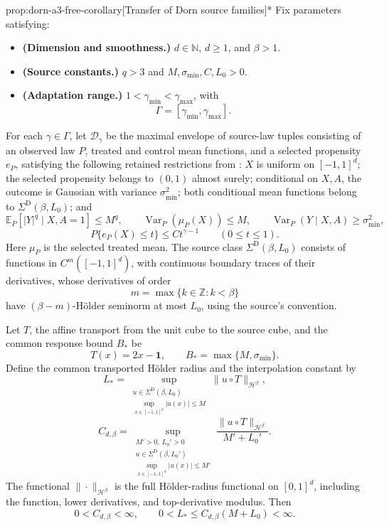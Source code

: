 \documentclass[11pt]{article}
\begin{document}
\begin{propositionv}{prop:dorn-a3-free-corollary}[Transfer of Dorn source families]*
Fix parameters satisfying:
\begin{itemize}
\item \textbf{(Dimension and smoothness.)} \(d\in\mathbb N\), \(d\ge1\), and \(\beta>1\).
\item \textbf{(Source constants.)} \(q>3\) and \(M,\sigma_{\min},C,L_0>0\).
\item \textbf{(Adaptation range.)} \(1<\gamma_{\min}<\gamma_{\max}\), with
\[
\Gamma=[\gamma_{\min},\gamma_{\max}].
\]
\end{itemize}

For each \(\gamma\in\Gamma\), let \(\mathcal D_\gamma\) be the maximal envelope of source-law tuples consisting of an observed law \(P\), treated and control mean functions, and a selected propensity \(e_P\), satisfying the following retained restrictions from \citet[Section 2, Assumptions 1--2, pp.~3--7]{Dorn2026GlobalOverlap}: \(X\) is uniform on \([-1,1]^d\); the selected propensity belongs to \((0,1)\) almost surely; conditional on \(X,A\), the outcome is Gaussian with variance \(\sigma_{\min}^2\); both conditional mean functions belong to \(\Sigma^{\mathrm D}(\beta,L_0)\); and
\[
\mathbb E_P\!\left[|Y|^q\mid X,A=1\right]\le M^q,
\qquad
\operatorname{Var}_P(\mu_P(X))\le M,
\qquad
\operatorname{Var}_P(Y\mid X,A)\ge\sigma_{\min}^2,
\]
\[
P\{e_P(X)\le t\}\le Ct^{\gamma-1}
\qquad (0\le t\le1).
\]
Here \(\mu_P\) is the selected treated mean. The source class \(\Sigma^{\mathrm D}(\beta,L_0)\) consists of functions in \(C^m([-1,1]^d)\), with continuous boundary traces of their derivatives, whose derivatives of order
\[
m=\max\{k\in\mathbb Z:k<\beta\}
\]
have \((\beta-m)\)-Hölder seminorm at most \(L_0\), using the source's convention.

Let \(T\), the affine transport from the unit cube to the source cube, and the common response bound \(B_*\) be
\[
T(x)=2x-\mathbf1,
\qquad
B_*=\max\{M,\sigma_{\min}\}.
\]
Define the common transported Hölder radius and the interpolation constant by
\[
L_*=
\sup_{\substack{u\in\Sigma^{\mathrm D}(\beta,L_0)\\
                 \sup_{x\in[-1,1]^d}|u(x)|\le M}}
\|u\circ T\|_{\mathcal H^\beta},
\]
\[
C_{d,\beta}=
\sup_{\substack{M'>0,\ L_0'>0\\
                 u\in\Sigma^{\mathrm D}(\beta,L_0')\\
                 \sup_{x\in[-1,1]^d}|u(x)|\le M'}}
\frac{\|u\circ T\|_{\mathcal H^\beta}}{M'+L_0'}.
\]
The functional \(\|\cdot\|_{\mathcal H^\beta}\) is the full Hölder-radius functional on \([0,1]^d\), including the function, lower derivatives, and top-derivative modulus. Then
\[
0<C_{d,\beta}<\infty,
\qquad
0<L_*\le C_{d,\beta}(M+L_0)<\infty.
\]


\end{propositionv}
\end{document}
